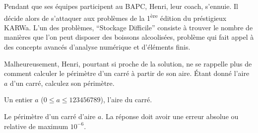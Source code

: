 \problemname{\problemyamlname}


\newcommand{\maxa}{123456789}

Pendant que ses équipes participent au BAPC, Henri, leur coach, s'ennuie.
Il décide alors de s'attaquer aux problèmes de la 1\textsuperscript{ère} édition du préstigieux KARWa.
L'un des problèmes, ``Stockage Difficile'' consiste à trouver le nombre de manières que l'on peut disposer des boissons alcoolisées, problème qui fait appel à des concepts avancés d'analyse numérique et d'éléments finis.

Malheureusement, Henri, pourtant si proche de la solution, ne se rappelle plus de comment calculer le périmètre d'un carré à partir de son aire.
Étant donné l'aire $a$ d'un carré, calculez son périmètre.

\begin{Input}
	Un entier $a$ ($0 \le a \le \maxa$), l'aire du carré.
\end{Input}

\begin{Output}
	Le périmètre d'un carré d'aire $a$.
	La réponse doit avoir une erreur absolue ou relative de maximum $10^{-6}$.
\end{Output}
